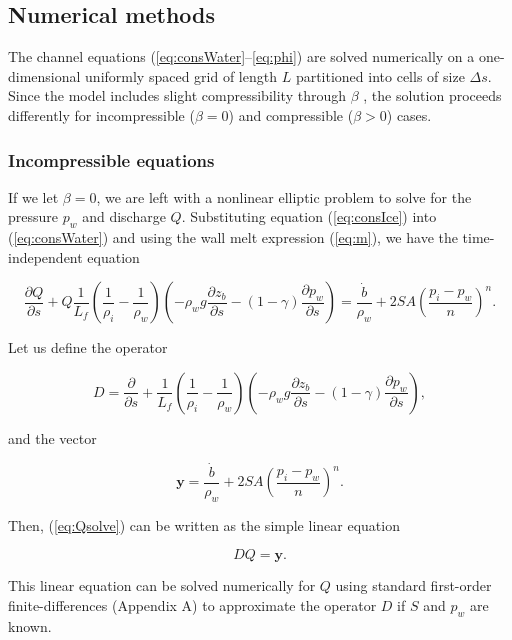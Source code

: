 \documentclass[11pt]{article}
\begin{document}
\subsection{Numerical methods}
The channel equations (\ref{eq:consWater}--\ref{eq:phi}) are solved numerically on a one-dimensional uniformly spaced grid of length $L$ partitioned into cells of size $\Delta s$. Since the \citet{clarke2003} model includes slight compressibility through $\beta$ \citep{clarke2003}, the solution proceeds differently for incompressible ($\beta = 0$) and compressible ($\beta > 0$) cases.

\subsubsection{Incompressible equations}
If we let $\beta = 0$, we are left with a nonlinear elliptic problem to solve for the pressure $p_w$ and discharge $Q$. Substituting equation (\ref{eq:consIce}) into (\ref{eq:consWater}) and using the wall melt expression (\ref{eq:m}), we have the time-independent equation
\begin{linenomath*}
\begin{equation}
\label{eq:Qsolve}
\frac{\partial Q}{\partial s} + Q\frac{1}{L_f}\left(\frac{1}{\rho_i} - \frac{1}{\rho_w}\right)\left(-\rho_w g \frac{\partial z_b}{\partial s} - (1 - \gamma)\frac{\partial p_w}{\partial s}\right) = \frac{\dot b}{\rho_w} + 2SA\left(\frac{p_i - p_w}{n}\right)^n.
\end{equation}
\end{linenomath*}
Let us define the operator
\begin{linenomath*}
\begin{equation}
\label{eq:D}
D = \frac{\partial}{\partial s} + \frac{1}{L_f}\left(\frac{1}{\rho_i} - \frac{1}{\rho_w}\right)\left(-\rho_w g \frac{\partial z_b}{\partial s} - (1 - \gamma)\frac{\partial p_w}{\partial s}\right),
\end{equation}
\end{linenomath*}
and the vector
\begin{linenomath*}
\begin{equation*}
\mathbf{y} = \frac{\dot b}{\rho_w} + 2SA\left(\frac{p_i - p_w}{n}\right)^n.
\end{equation*}
\end{linenomath*}
Then, (\ref{eq:Qsolve}) can be written as the simple linear equation
\begin{linenomath*}
\begin{equation}
\label{eq:DQ}
D Q = \mathbf{y}.
\end{equation}
\end{linenomath*}
This linear equation can be solved numerically for $Q$ using standard first-order finite-differences (Appendix A) to approximate the operator $D$ if $S$ and $p_w$ are known.
\end{document}
